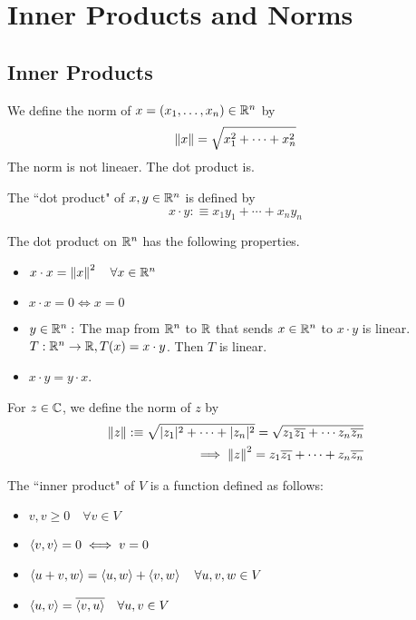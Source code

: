 \section{Inner Products and Norms}

\subsection{Inner Products}
We define the norm of $x=(x_1, \ldots, x_n) \in \mathbb{R}^n$ by
\begin{equation}
  \left \lVert x \right \rVert = \sqrt{x_1^2 + \cdots + x_n^2}
\end{equation}
The norm is not lineaer. The dot product is.

\begin{mydef} 
  The ``dot product" of $x,y \in \mathbb{R}^n$ is defined by
  \begin{equation}
    x \cdot y :\equiv x_1 y_1 + \cdots + x_n y_n
  \end{equation}
\end{mydef}

The dot product on $\mathbb{R}^n$ has the following properties.
\begin{itemize}
  \item $x \cdot x = \left \lVert x \right \rVert^2 \quad \forall x \in \mathbb{R}^n$ 
  \item $x \cdot x = 0 \iff x= 0$
  \item $y\in \mathbb{R}^n:$ The map from $\mathbb{R}^n$ to $\mathbb{R}$ that sends $x \in \mathbb{R}^n$ to $x\cdot y$ is linear. \\
  $T: \mathbb{R}^n \to \mathbb{R}, T(x) = x \cdot y$. Then $T$ is linear.
  \item $x \cdot y = y \cdot x$.
\end{itemize}

For $z \in \mathbb{C}$, we define the norm of $z$ by
\begin{equation}
  \begin{aligned}
    \left \lVert z \right \rVert :\equiv \sqrt{ |z_1|^2 + \cdots + |z_n|^2} = \sqrt{ z_1 \overline {z_1} + \cdots z_n \overline {z_n}} \\
    \implies \left \lVert z \right \rVert^2 = z_1 \overline{z_1} + \cdots + z_n \overline{z_n}
  \end{aligned}
\end{equation}

\begin{mydef} 
  The ``inner product" of $V$ is a function defined as follows:
  \begin{itemize}
    \item {} $
    {v,v} \geq 0 \quad \forall v \in V$
    \item {} $\langle v,v\rangle = 0 \iff v=0$
    \item {} $\left \langle u+v, w \right \rangle=\left \langle u, w \right \rangle+\left \langle v, w \right \rangle \quad \forall u,v,w \in V$
    \item {} $\left \langle u, v \right \rangle = \overline{\left \langle v, u \right \rangle} \quad \forall u, v \in V$ 
  \end{itemize}
\end{mydef}

